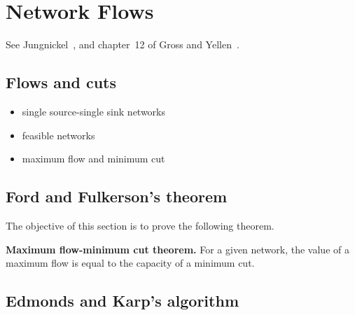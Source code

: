 
\chapter{Network Flows}
\label{chap:network_flows}

See Jungnickel~\cite{Jungnickel2008}, and chapter~12 of Gross and
Yellen~\cite{GrossYellen1999}.



\section{Flows and cuts}

\begin{itemize}
\item single source-single sink networks

\item feasible networks

\item maximum flow and minimum cut
\end{itemize}



\section{Ford and Fulkerson's theorem}

The objective of this section is to prove the following theorem.

\begin{theorem}
\textbf{Maximum flow-minimum cut theorem.}
For a given network, the value of a maximum flow is equal to the
capacity of a minimum cut.
\end{theorem}



\section{Edmonds and Karp's algorithm}

